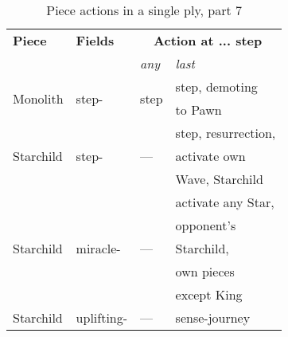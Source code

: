 \begin{table}[!h]
\centering
\begin{tabular}{ llll }
\toprule %
\textbf{Piece}              & \textbf{Fields}           & \multicolumn{2}{c}{ \textbf{Action at ... step} }         \\
                                                        \cmidrule{3-4} %
                            &                           & \emph{any}\footnotemark[1]    & \emph{last}               \\
\midrule %
\multirow{2}{*}{Monolith}   & \multirow{2}{*}{step-}    & \multirow{2}{*}{step}         & step, demoting            \\
                            &                           &                               & to Pawn                   \\
\cmidrule{1-4} %
\multirow{3}{*}{Starchild}  & \multirow{3}{*}{step-}    & \multirow{3}{*}{---}          & step, resurrection,       \\
                            &                           &                               & activate own              \\
                            &                           &                               & Wave, Starchild           \\
\cmidrule{1-4} %
\multirow{5}{*}{Starchild}  & \multirow{5}{*}{miracle-} & \multirow{5}{*}{---}          & activate any Star,        \\
                            &                           &                               & opponent's                \\
                            &                           &                               & Starchild,                \\
                            &                           &                               & own pieces                \\
                            &                           &                               & except King               \\
\cmidrule{1-4} %
Starchild                   & uplifting-                & ---                           & sense-journey             \\
\bottomrule %
\end{tabular}
\caption{Piece actions in a single ply, part 7}
\label{tbl:Appendix/Summary/Piece actions, part 7}
\end{table}

